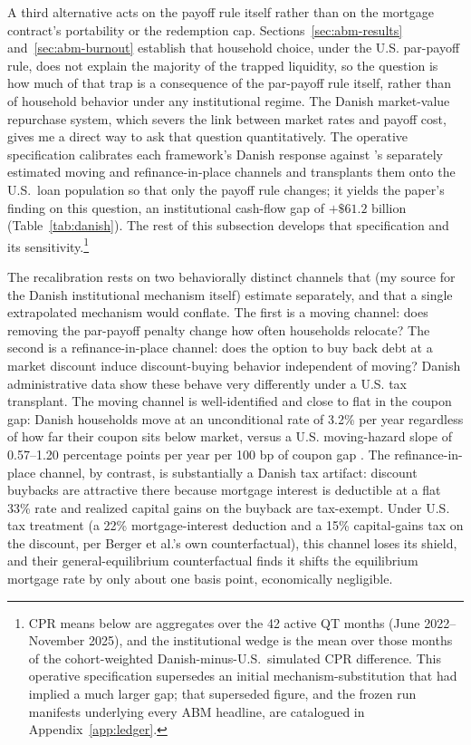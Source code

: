 \documentclass[12pt]{article}
\begin{document}
A third alternative acts on the payoff rule itself rather than on the mortgage contract's portability or the redemption cap. Sections~\ref{sec:abm-results} and~\ref{sec:abm-burnout} establish that household choice, under the U.S. par-payoff rule, does not explain the majority of the trapped liquidity, so the question is how much of that trap is a consequence of the par-payoff rule itself, rather than of household behavior under any institutional regime. The Danish market-value repurchase system, which severs the link between market rates and payoff cost, gives me a direct way to ask that question quantitatively. The operative specification calibrates each framework's Danish response against \citet{berger2026}'s separately estimated moving and refinance-in-place channels and transplants them onto the U.S.\ loan population so that only the payoff rule changes; it yields the paper's finding on this question, an institutional cash-flow gap of $+\$61.2$ billion (Table~\ref{tab:danish}). The rest of this subsection develops that specification and its sensitivity.\footnote{\label{fn:manifest}CPR means below are aggregates over the 42 active QT months (June 2022--November 2025), and the institutional wedge is the mean over those months of the cohort-weighted Danish-minus-U.S.\ simulated CPR difference. This operative specification supersedes an initial mechanism-substitution that had implied a much larger gap; that superseded figure, and the frozen run manifests underlying every ABM headline, are catalogued in Appendix~\ref{app:ledger}.}

The recalibration rests on two behaviorally distinct channels that \citet{berger2026} (my source for the Danish institutional mechanism itself) estimate separately, and that a single extrapolated mechanism would conflate. The first is a moving channel: does removing the par-payoff penalty change how often households relocate? The second is a refinance-in-place channel: does the option to buy back debt at a market discount induce discount-buying behavior independent of moving? Danish administrative data show these behave very differently under a U.S. tax transplant. The moving channel is well-identified and close to flat in the coupon gap: Danish households move at an unconditional rate of 3.2\% per year regardless of how far their coupon sits below market, versus a U.S. moving-hazard slope of 0.57--1.20 percentage points per year per 100 bp of coupon gap \citep{fonseca2024}. The refinance-in-place channel, by contrast, is substantially a Danish tax artifact: discount buybacks are attractive there because mortgage interest is deductible at a flat 33\% rate and realized capital gains on the buyback are tax-exempt. Under U.S. tax treatment (a 22\% mortgage-interest deduction and a 15\% capital-gains tax on the discount, per Berger et al.'s own counterfactual), this channel loses its shield, and their general-equilibrium counterfactual finds it shifts the equilibrium mortgage rate by only about one basis point, economically negligible.
\end{document}
